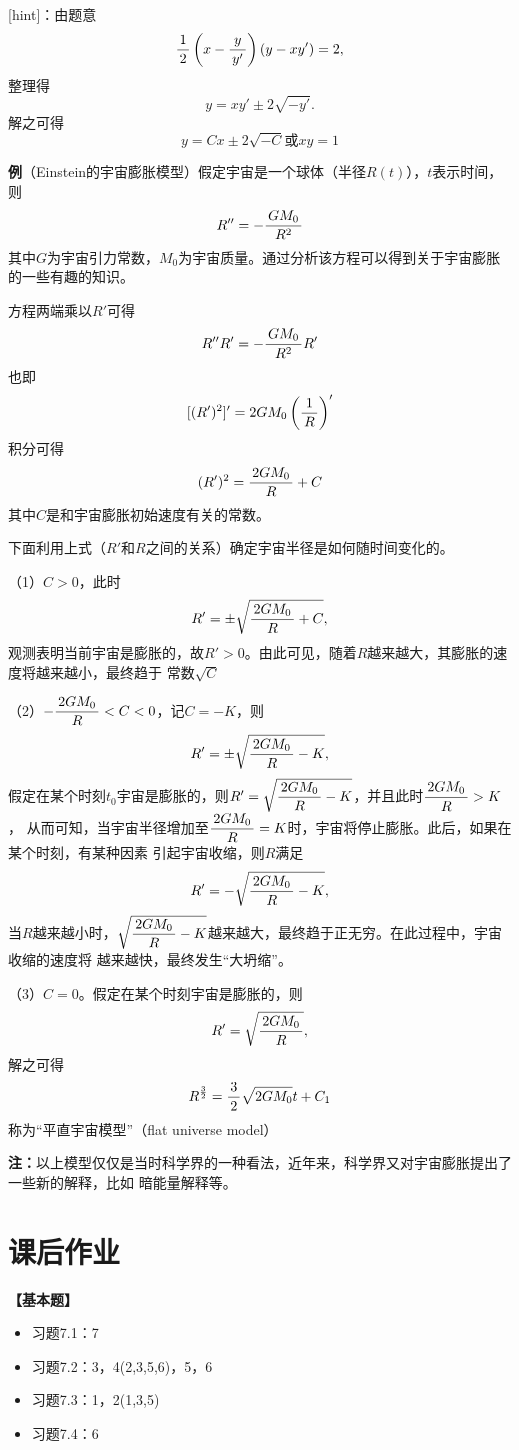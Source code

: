 [hint]：由题意
$$\displaystyle\frac{\,{1}\,}{\,{2}\,}\left(x-\displaystyle\frac{\,{y}\,}{\,{y'}\,}\right)(y-xy')=2,$$
整理得
$$y=xy'\pm2\sqrt{-y'}.$$
解之可得
$$y=Cx\pm2\sqrt{-C}\mbox{或}xy=1$$

\begin{shaded}

{\bf 例}（Einstein的宇宙膨胀模型）假定宇宙是一个球体（半径$R(t)$），$t$表示时间，则
$$R''=-\displaystyle\frac{\,{GM_0}\,}{\,{R^2}\,}$$
其中$G$为宇宙引力常数，$M_0$为宇宙质量。通过分析该方程可以得到关于宇宙膨胀的一些有趣的知识。

方程两端乘以$R'$可得
$$R''R'=-\displaystyle\frac{\,{GM_0}\,}{\,{R^2}\,}R'$$
也即
$$[(R')^2]'=2GM_0\left(\displaystyle\frac{\,{1}\,}{\,{R}\,}\right)'$$
积分可得
$$(R')^2=\displaystyle\frac{\,{2GM_0}\,}{\,{R}\,}+C$$
其中$C$是和宇宙膨胀初始速度有关的常数。

下面利用上式（$R'$和$R$之间的关系）确定宇宙半径是如何随时间变化的。

（1）$C>0$，此时
$$R'=\pm\sqrt{\displaystyle\frac{\,{2GM_0}\,}{\,{R}\,}+C},$$
观测表明当前宇宙是膨胀的，故$R'>0$。由此可见，随着$R$越来越大，其膨胀的速度将越来越小，最终趋于
常数$\sqrt C$

（2）$-\displaystyle\frac{\,{2GM_0}\,}{\,{R}\,}<C<0$，记$C=-K$，则
$$R'=\pm\sqrt{\displaystyle\frac{\,{2GM_0}\,}{\,{R}\,}-K},$$
假定在某个时刻$t_0$宇宙是膨胀的，则$R'=\sqrt{\displaystyle\frac{\,{2GM_0}\,}{\,{R}\,}-K}$，并且此时$\displaystyle\frac{\,{2GM_0}\,}{\,{R}\,}>K$，
从而可知，当宇宙半径增加至$\displaystyle\frac{\,{2GM_0}\,}{\,{R}\,}=K$时，宇宙将停止膨胀。此后，如果在某个时刻，有某种因素
引起宇宙收缩，则$R$满足
$$R'=-\sqrt{\displaystyle\frac{\,{2GM_0}\,}{\,{R}\,}-K},$$
当$R$越来越小时，$\sqrt{\displaystyle\frac{\,{2GM_0}\,}{\,{R}\,}-K}$越来越大，最终趋于正无穷。在此过程中，宇宙收缩的速度将
越来越快，最终发生“大坍缩”。

（3）$C=0$。假定在某个时刻宇宙是膨胀的，则
$$R'=\sqrt{\displaystyle\frac{\,{2GM_0}\,}{\,{R}\,}},$$
解之可得
$$R^{\frac32}=\displaystyle\frac{\,{3}\,}{\,{2}\,}\sqrt{2GM_0}t+C_1$$
称为“平直宇宙模型”（flat universe model）

{\bf 注：}以上模型仅仅是当时科学界的一种看法，近年来，科学界又对宇宙膨胀提出了一些新的解释，比如
暗能量解释等。

\end{shaded}

\newpage

\section*{课后作业}

{\bf 【基本题】}

\begin{itemize}
  \setlength{\itemindent}{1cm}
  \item 习题7.1：7
  \item 习题7.2：3，4(2,3,5,6)，5，6
  \item 习题7.3：1，2(1,3,5)
  \item 习题7.4：6
\end{itemize}

